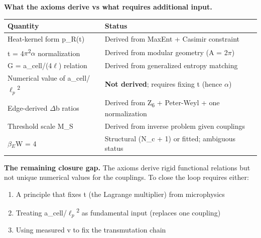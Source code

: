 \documentclass[11pt,a4paper]{article}
\theoremstyle{remark}
\providecommand{\tightlist}{%
  \setlength{\itemsep}{0pt}\setlength{\parskip}{0pt}}
\begin{document}
\textbf{What the axioms derive vs what requires additional input.}

{\def\LTcaptype{none} %
\begin{longtable}[]{@{}
  >{\raggedright\arraybackslash}p{}
  >{\raggedright\arraybackslash}p{}@{}}
\toprule\noalign{}
\begin{minipage}[b]{\linewidth}\raggedright
Quantity
\end{minipage} & \begin{minipage}[b]{\linewidth}\raggedright
Status
\end{minipage} \\
\midrule\noalign{}
\endhead
\bottomrule\noalign{}
\endlastfoot
Heat-kernel form p\_R(t) & Derived from MaxEnt + Casimir constraint \\
t = 4\ensuremath{\pi}\textsuperscript{2}\ensuremath{\alpha} normalization & Derived from modular geometry (A = 2\ensuremath{\pi}) \\
G = a\_cell/(4\ensuremath{\ell}) relation & Derived from generalized entropy matching \\
Numerical value of a\_cell/\(\ell_p\)\textsuperscript{2} & \textbf{Not derived}; requires fixing t (hence \ensuremath{\alpha}) \\
Edge-derived \ensuremath{\Delta}b ratios & Derived from Z\textsubscript{6} + Peter-Weyl + one normalization \\
Threshold scale M\_S & Derived from inverse problem given couplings \\
\(\beta{}_E\)W = 4 & Structural (N\_c + 1) or fitted; ambiguous status \\
\end{longtable}
}

\textbf{The remaining closure gap.} The axioms derive rigid functional relations but not unique numerical values for the couplings. To close the loop requires either:

\begin{enumerate}
\def\labelenumi{\arabic{enumi}.}
\tightlist
\item
  A principle that fixes t (the Lagrange multiplier) from microphysics
\item
  Treating a\_cell/\(\ell_p\)\textsuperscript{2} as fundamental input (replaces one coupling)
\item
  Using measured v to fix the transmutation chain
\end{enumerate}
\end{document}
